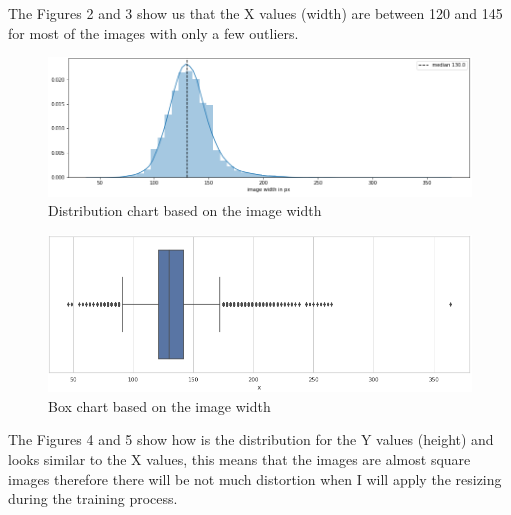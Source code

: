 \documentclass[a4paper]{article}
\begin{document}
	\medskip
	The Figures 2 and 3 show us that the X values (width) are between 120 and 145 for most of the images with only a few outliers.

	
	\begin{figure}[H]
		\centering
		\includegraphics[width=.9\textwidth]{dist_x.png}
		\caption{Distribution chart based on the image width}
		\label{fig:width_dist}
	\end{figure}
	\begin{figure}[H]
		\includegraphics[width=.9\textwidth]{box_x.png}
		\caption{Box chart based on the image width}
		\label{fig:width_box}
	\end{figure}

	\medskip
	The Figures 4 and 5 show how is the distribution for the  Y values (height) and looks similar to the X values, this means that the images are almost square images therefore there will be not much distortion when I will apply the resizing during the training process.
	
\end{document}

